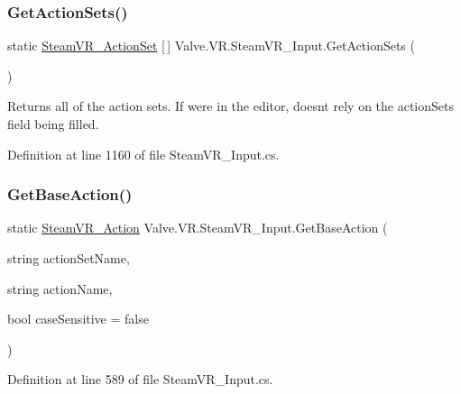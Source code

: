 \subsubsection{\texorpdfstring{GetActionSets()}{GetActionSets()}}
{\footnotesize\ttfamily static \mbox{\hyperlink{class_valve_1_1_v_r_1_1_steam_v_r___action_set}{Steam\+V\+R\+\_\+\+Action\+Set}} \mbox{[}$\,$\mbox{]} Valve.\+V\+R.\+Steam\+V\+R\+\_\+\+Input.\+Get\+Action\+Sets (\begin{DoxyParamCaption}{ }\end{DoxyParamCaption})\hspace{0.3cm}{\ttfamily [static]}}



Returns all of the action sets. If we\textquotesingle{}re in the editor, doesn\textquotesingle{}t rely on the action\+Sets field being filled. 



Definition at line 1160 of file Steam\+V\+R\+\_\+\+Input.\+cs.

\mbox{\label{class_valve_1_1_v_r_1_1_steam_v_r___input_a635ec3bc7211d524ccd9bf463b5346e3}} 
\subsubsection{\texorpdfstring{GetBaseAction()}{GetBaseAction()}}
{\footnotesize\ttfamily static \mbox{\hyperlink{class_valve_1_1_v_r_1_1_steam_v_r___action}{Steam\+V\+R\+\_\+\+Action}} Valve.\+V\+R.\+Steam\+V\+R\+\_\+\+Input.\+Get\+Base\+Action (\begin{DoxyParamCaption}\item[{string}]{action\+Set\+Name,  }\item[{string}]{action\+Name,  }\item[{bool}]{case\+Sensitive = {\ttfamily false} }\end{DoxyParamCaption})\hspace{0.3cm}{\ttfamily [static]}}



Definition at line 589 of file Steam\+V\+R\+\_\+\+Input.\+cs.

\mbox{\label{class_valve_1_1_v_r_1_1_steam_v_r___input_ab209d6c5f511a9a334f1138cb66aa2fb}} 
